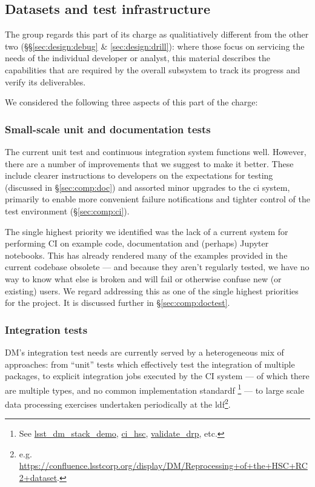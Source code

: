 \subsection{Datasets and test infrastructure}
\label{sec:design:test}

The group regards this part of its charge as qualitiatively different from the
other two (\S\S\ref{sec:design:debug} \& \ref{sec:design:drill}): where those
focus on servicing the needs of the individual developer or analyst, this
material describes the capabilities that are required by the overall subsystem
to track its progress and verify its deliverables.

We considered the following three aspects of this part of the charge:

\subsubsection{Small-scale unit and documentation tests}

The current unit test and continuous integration system functions well.
However, there are a number of improvements that we suggest to make it better.
These include clearer instructions to developers on the expectations for
testing (discussed in \S\ref{sec:comp:doc}) and assorted minor upgrades to the
\gls{ci} system, primarily to enable more convenient failure notifications and
tighter control of the test environment (\S\ref{sec:comp:ci}).

The single highest priority we identified was the lack of a current system for
performing CI on example code, documentation and (perhaps) Jupyter notebooks.
This has already rendered many of the examples provided in the current
codebase obsolete --- and because they aren't regularly tested, we have no way
to know what else is broken and will fail or otherwise confuse new (or
existing) users. We regard addressing this as one of the single highest
priorities for the project. It is discussed further in
\S\ref{sec:comp:doctest}.

\subsubsection{Integration tests}
\label{sec:design:test:integration}

DM's integration test needs are currently served by a heterogeneous mix of
approaches: from ``unit'' tests which effectively test the integration of
multiple packages, to explicit integration jobs executed by the CI
system --- of which there are multiple types, and no common
implementation standardf \footnote{See
\href{https://github.com/lsst/lsst_dm_stack_demo}{lsst\_dm\_stack\_demo},
\href{https://github.com/lsst/ci_hsc}{ci\_hsc},
\href{https://github.com/lsst/validate_drp}{validate\_drp}, etc.} --- to large
scale data processing exercises undertaken periodically at the
\gls{ldf}\footnote{e.g.
\url{https://confluence.lsstcorp.org/display/DM/Reprocessing+of+the+HSC+RC2+dataset}.}.

